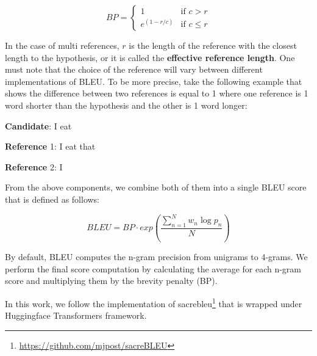 \begin{equation}
    BP=\begin{cases} 1 & \mbox{if } c>r \\ e^{(1-r/c)} & \mbox{if } c\le r \end{cases}
\end{equation}

In the case of multi references, $r$ is the length of the reference with the closest length to the hypothesis, or it is called the \textbf{effective reference length}. One must note that the choice of the reference will vary between different implementations of BLEU. To be more precise, take the following example that shows the difference between two references is equal to 1 where one reference is 1 word shorter than the hypothesis and the other is 1 word longer:

\bigskip

\textbf{Candidate}: I eat

\textbf{Reference} 1: I eat that

\textbf{Reference} 2: I

\bigskip

From the above components, we combine both of them into a single BLEU score that is defined as follows:

\begin{equation}
    BLEU=BP\cdot exp\left( \frac{\sum_{n=1}^{N} w_n \log p_n}{N} \right)
\end{equation}

By default, BLEU computes the n-gram precision from unigrams to 4-grams. We perform the final score computation by calculating the average for each n-gram score and multiplying them by the brevity penalty (BP).

In this work, we follow the implementation of sacrebleu\footnote{\url{https://github.com/mjpost/sacreBLEU}} that is wrapped under Huggingface Transformers framework.